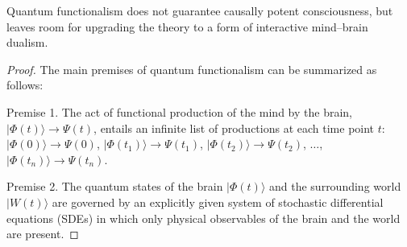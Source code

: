 \documentclass{ws-ijmpb}
\begin{document}
\begin{theorem}
\label{thm:3}
Quantum functionalism does not guarantee causally potent consciousness, but leaves room for upgrading the theory to a form of interactive mind--brain dualism.
\end{theorem}
\begin{proof}
The main premises of quantum functionalism can be summarized as follows:

Premise 1. The act of functional production of the mind by the brain,
$\vert \Phi(t)\rangle\rightarrow\Psi(t)$, entails an infinite list of
productions at each time point $t$: $\vert \Phi(0)\rangle\rightarrow\Psi(0)$,
$\vert \Phi(t_1)\rangle\rightarrow\Psi(t_1)$, $\vert \Phi(t_2)\rangle\rightarrow\Psi(t_2)$,
$\ldots$, $\vert \Phi(t_n)\rangle\rightarrow\Psi(t_n)$.

Premise 2. The quantum states of the brain $\vert \Phi(t)\rangle$ and
the surrounding world $\vert W(t)\rangle$ are governed by an explicitly
given system of stochastic differential equations (SDEs) in which
only physical observables of the brain and the world are present.


\end{proof}
\end{document}
